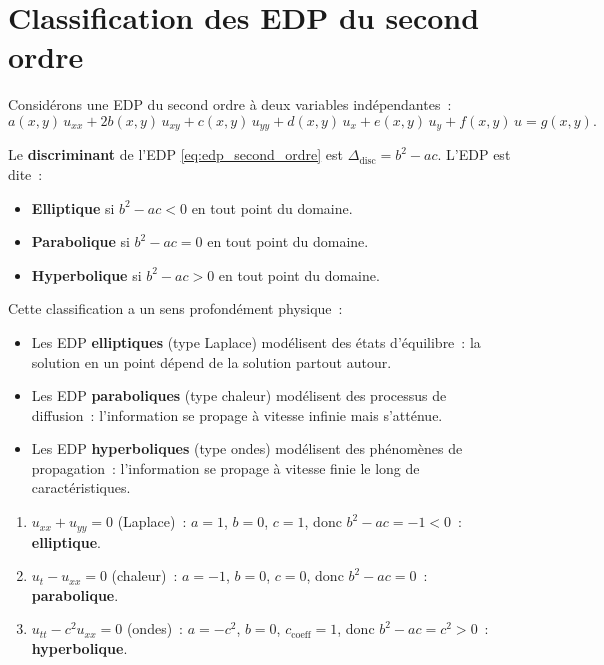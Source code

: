 \section{Classification des EDP du second ordre}

Consid\'erons une EDP du second ordre \`a deux variables ind\'ependantes~:
\begin{equation}\label{eq:edp_second_ordre}
    a(x,y)\, u_{xx} + 2b(x,y)\, u_{xy} + c(x,y)\, u_{yy}
    + d(x,y)\, u_x + e(x,y)\, u_y + f(x,y)\, u = g(x,y).
\end{equation}

\begin{definition}
Le \textbf{discriminant} de l'EDP \eqref{eq:edp_second_ordre} est
$\Delta_{\mathrm{disc}} = b^2 - ac$. L'EDP est dite~:
\begin{itemize}
    \item \textbf{Elliptique} si $b^2 - ac < 0$ en tout point du domaine.
    \item \textbf{Parabolique} si $b^2 - ac = 0$ en tout point du domaine.
    \item \textbf{Hyperbolique} si $b^2 - ac > 0$ en tout point du domaine.
\end{itemize}
\end{definition}

\begin{intuition}
Cette classification a un sens profond\'ement physique~:
\begin{itemize}
    \item Les EDP \textbf{elliptiques} (type Laplace) mod\'elisent des
          \'etats d'\'equilibre~: la solution en un point d\'epend de la
          solution partout autour.
    \item Les EDP \textbf{paraboliques} (type chaleur) mod\'elisent des
          processus de diffusion~: l'information se propage \`a vitesse
          infinie mais s'att\'enue.
    \item Les EDP \textbf{hyperboliques} (type ondes) mod\'elisent des
          ph\'enom\`enes de propagation~: l'information se propage \`a vitesse finie
          le long de caract\'eristiques.
\end{itemize}
\end{intuition}

\begin{exemple}
\leavevmode
\begin{enumerate}
    \item $u_{xx} + u_{yy} = 0$ (Laplace)~: $a = 1$, $b = 0$, $c = 1$,
          donc $b^2 - ac = -1 < 0$~: \textbf{elliptique}.
    \item $u_t - u_{xx} = 0$ (chaleur)~: $a = -1$, $b = 0$, $c = 0$,
          donc $b^2 - ac = 0$~: \textbf{parabolique}.
    \item $u_{tt} - c^2 u_{xx} = 0$ (ondes)~: $a = -c^2$, $b = 0$, $c_{\text{coeff}} = 1$,
          donc $b^2 - ac = c^2 > 0$~: \textbf{hyperbolique}.
\end{enumerate}
\end{exemple}

